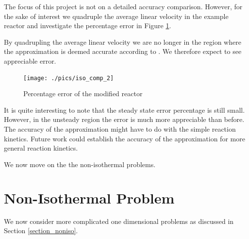 \documentclass[11pt,fleqn]{article}
\theoremstyle{defstyle}
\begin{document}
The focus of this project is not on a detailed accuracy comparison. However, for the sake of interest we quadruple the average linear velocity in the example reactor and investigate the percentage error in Figure \ref{fig_isocomp2}.

By quadrupling the average linear velocity we are no longer in the region where the approximation is deemed accurate according to \cite{washington}. We therefore expect to see appreciable error. 
\begin{figure}[H] 
\centering
\texttt{[image: ./pics/iso\_comp\_2]}
\caption{Percentage error of the modified reactor} 
\label{fig_isocomp2}
\end{figure}
It is quite interesting to note that the steady state error percentage is still small. However, in the unsteady region the error is much more appreciable than before. The accuracy of the approximation might have to do with the simple reaction kinetics. Future work could establish the accuracy of the approximation for more general reaction kinetics.

We now move on the the non-isothermal problems.

\section{Non-Isothermal Problem}

We now consider more complicated one dimensional problems as discussed in Section \ref{section_noniso}.
\end{document}
